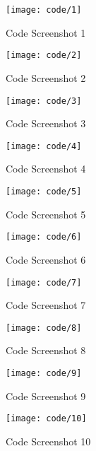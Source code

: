 
\begin{figure}[ht]
	\centering
	\texttt{[image: code/1]}
	\caption{Code Screenshot 1}
	\label{fig:code1}
\end{figure}

\begin{figure}[ht]
	\centering
	\texttt{[image: code/2]}
	\caption{Code Screenshot 2}
	\label{fig:code2}
\end{figure}

\begin{figure}[ht]
	\centering
	\texttt{[image: code/3]}
	\caption{Code Screenshot 3}
	\label{fig:code3}
\end{figure}

\begin{figure}[ht]
	\centering
	\texttt{[image: code/4]}
	\caption{Code Screenshot 4}
	\label{fig:code4}
\end{figure}

\begin{figure}[ht]
	\centering
	\texttt{[image: code/5]}
	\caption{Code Screenshot 5}
	\label{fig:code5}
\end{figure}

\begin{figure}[ht]
	\centering
	\texttt{[image: code/6]}
	\caption{Code Screenshot 6}
	\label{fig:code6}
\end{figure}

\begin{figure}[ht]
	\centering
	\texttt{[image: code/7]}
	\caption{Code Screenshot 7}
	\label{fig:code7}
\end{figure}

\begin{figure}[ht]
	\centering
	\texttt{[image: code/8]}
	\caption{Code Screenshot 8}
	\label{fig:code8}
\end{figure}

\begin{figure}[ht]
	\centering
	\texttt{[image: code/9]}
	\caption{Code Screenshot 9}
	\label{fig:code9}
\end{figure}

\begin{figure}[ht]
	\centering
	\texttt{[image: code/10]}
	\caption{Code Screenshot 10}
	\label{fig:code10}
\end{figure}

